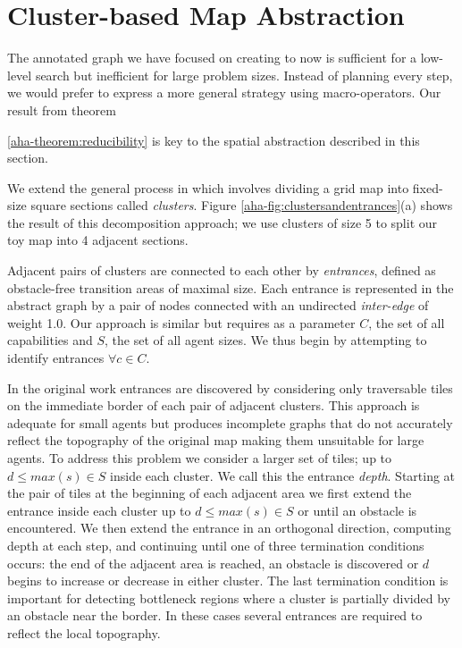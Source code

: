 \section{Cluster-based Map Abstraction}
\label{aha:mapabstraction}
The annotated graph we have focused on creating to now is sufficient for a low-level search but inefficient for large problem sizes. 
Instead of planning every step, we would prefer to express a more general strategy using macro-operators.
Our result from theorem {\ref{aha-theorem:reducibility} is key to the spatial abstraction described in this section. 
\par \indent
We extend the general process in \cite{botea04} which involves dividing a grid map into fixed-size square sections called \emph{clusters}. Figure \ref{aha-fig:clustersandentrances}(a) shows the result of this decomposition approach; we use clusters of size 5 to split our toy map into 4 adjacent sections.
\par \indent
Adjacent pairs of clusters are connected to each other by \emph{entrances}, defined as obstacle-free transition areas of maximal size. 
Each entrance is represented in the abstract graph by a pair of nodes connected with an undirected \emph{inter-edge} of weight 1.0. 
Our approach is similar but requires as a parameter $C$, the set of all capabilities and $S$, the set of all agent sizes. 
We thus begin by attempting to identify entrances $\forall c \in C$. 
\par \indent
In the original work entrances are discovered by considering only traversable tiles on the immediate border of each pair of adjacent clusters.
This approach is adequate for small agents but produces incomplete graphs that do not accurately reflect the topography of the original map making them unsuitable for large agents.
To address this problem we consider a larger set of tiles; up to $d \leq max(s) \in S$  inside each cluster.  
We call this  the entrance \emph{depth}. 
Starting at the pair of tiles at the beginning of each adjacent area we first extend the entrance inside each cluster up to $d \leq max(s) \in S$ or until an obstacle is encountered.  
We then extend the entrance in an orthogonal direction, computing depth at each step, and continuing until one of three termination conditions occurs: the end of the adjacent area is reached, an obstacle is discovered or $d$ begins to increase or decrease in either cluster. 
The last termination condition is important for detecting bottleneck regions where a cluster is partially divided by an obstacle near the border. 
In these cases several entrances are required to reflect the local topography.
}
